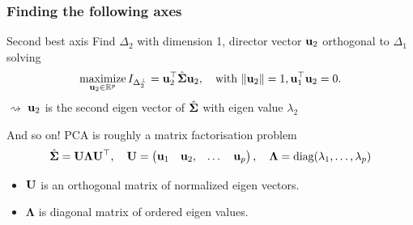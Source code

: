\documentclass{beamer}\usepackage[]{graphicx}\usepackage[]{color}
\begin{document}
\begin{frame}
  \frametitle{Finding the following axes}

  \begin{block}{Second best axis}
    Find $\Delta_2$ with dimension 1, director vector $\mathbf{u}_2$ orthogonal to $\Delta_1$ solving
    \begin{equation*}
        \mathop{\mathrm{maximize}}_{\mathbf{u}_2 \in \mathbb{R}^p} I_{\Delta_2^\bot} = \mathbf{u}_2^\top \hat{\boldsymbol{\Sigma}}\mathbf{u}_2, \quad \text{with } \|\mathbf{u}_2\| = 1, \mathbf{u}_1^\top \mathbf{u}_2 = 0.
    \end{equation*} 
  $\rightsquigarrow$ $\mathbf{u}_2$ is the second eigen vector of $\hat{\boldsymbol{\Sigma}}$ with eigen value $\lambda_2$
  \end{block}
  
  \vfill
  \pause
  
  \begin{block}{And so on!}
    PCA is roughly a matrix factorisation problem 
    \begin{equation*}
      \hat{\boldsymbol{\Sigma}} = \mathbf{U} \boldsymbol\Lambda \mathbf{U}^\top, \quad
      \mathbf{U} = \begin{pmatrix}
      \mathbf{u}_1 & \mathbf{u}_2, & \dots & \mathbf{u}_p
      \end{pmatrix}, \quad \boldsymbol\Lambda = \text{diag}(\lambda_1, \dots, \lambda_p)
    \end{equation*}
    \hspace{-.5cm}
  \begin{itemize}
    \item $\mathbf{U}$ is an orthogonal matrix of normalized eigen vectors.
    \item $\boldsymbol\Lambda$ is diagonal matrix of  ordered eigen values.
  \end{itemize}
  \end{block}
\end{frame}
\end{document}
